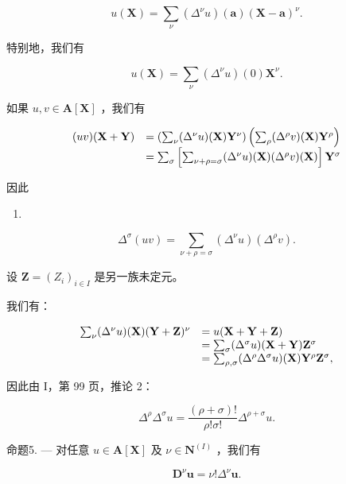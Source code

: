 \[
u (\mathbf {X}) = \sum_ {\nu} \left(\Delta^ {\nu} u\right) (\mathbf {a}) (\mathbf {X} - \mathbf {a}) ^ {\nu}.\tag{10}
\]

特别地，我们有

\[
u (\mathbf {X}) = \sum_ {\nu} \left(\Delta^ {\nu} u\right) (0) \mathbf {X} ^ {\nu}.\tag{11}
\]

如果 \(u, v \in \mathbf{A}[\mathbf{X}]\) ，我们有

\[
\begin{array}{r l} (u v) (\mathbf {X} + \mathbf {Y}) & = \left(\sum_ {\nu} (\Delta^ {\nu} u) (\mathbf {X}) \mathbf {Y} ^ {\nu}\right) \left(\sum_ {\rho} (\Delta^ {\rho} v) (\mathbf {X}) \mathbf {Y} ^ {\rho}\right) \\ & = \sum_ {\sigma} \left[ \sum_ {\nu + \rho = \sigma} (\Delta^ {\nu} u) (\mathbf {X}) (\Delta^ {\rho} v) (\mathbf {X}) \right] \mathbf {Y} ^ {\sigma} \end{array}
\]

因此

\begin{enumerate}
\def\labelenumi{(\arabic{enumi})}
\setcounter{enumi}{11}
\tightlist
\item
\end{enumerate}

\[
\Delta^ {\sigma} (u v) = \sum_ {\nu + \rho = \sigma} (\Delta^ {\nu} u) (\Delta^ {\rho} v).
\]

设 \(\mathbf{Z} = (Z_i)_{i\in I}\) 是另一族未定元。

我们有：

\[
\begin{array}{r l} \sum_ {\nu} (\Delta^ {\nu} u) (\mathbf {X}) (\mathbf {Y} + \mathbf {Z}) ^ {\nu} & = u (\mathbf {X} + \mathbf {Y} + \mathbf {Z}) \\ & = \sum_ {\sigma} (\Delta^ {\sigma} u) (\mathbf {X} + \mathbf {Y}) \mathbf {Z} ^ {\sigma} \\ & = \sum_ {\rho , \sigma} (\Delta^ {\rho} \Delta^ {\sigma} u) (\mathbf {X}) \mathbf {Y} ^ {\rho} \mathbf {Z} ^ {\sigma}, \end{array}
\]

因此由 I，第 99 页，推论 2：

\[
\Delta^ {\rho} \Delta^ {\sigma} u = \frac {(\rho + \sigma) !}{\rho ! \sigma !} \Delta^ {\rho + \sigma} u.\tag{13}
\]

命题5. --- 对任意 \(u \in \mathbf{A}[\mathbf{X}]\) 及 \(\nu \in \mathbf{N}^{(I)}\) ，我们有

\[
\mathbf {D} ^ {\nu} \boldsymbol {u} = \nu ! \Delta^ {\nu} \boldsymbol {u}.
\]

